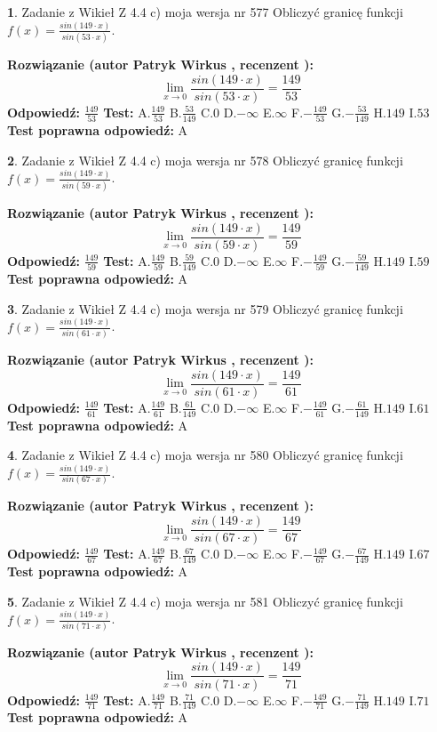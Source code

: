 \documentclass[12pt, a4paper]{article}
\theoremstyle{definition} %
\newtheorem{zad}{}
\newcommand{\zadStart}[1]{\begin{zad}#1\newline}
\newcommand{\zadStop}{\end{zad}}
\newcommand{\rozwStart}[2]{\noindent \textbf{Rozwiązanie (autor #1 , recenzent #2): }\newline}
\newcommand{\rozwStop}{\newline}
\newcommand{\odpStart}{\noindent \textbf{Odpowiedź:}\newline}
\newcommand{\odpStop}{\newline}
\newcommand{\testStart}{\noindent \textbf{Test:}\newline}
\newcommand{\testStop}{\newline}
\newcommand{\kluczStart}{\noindent \textbf{Test poprawna odpowiedź:}\newline}
\newcommand{\kluczStop}{\newline}
\begin{document}
\zadStart{Zadanie z Wikieł Z 4.4 c) moja wersja nr 577}
Obliczyć granicę funkcji $f(x)=\frac{sin(149\cdot x)}{sin(53\cdot x)}$.
\zadStop
\rozwStart{Patryk Wirkus}{}
$$\lim\limits_{x\to 0}\frac{sin(149\cdot x)}{sin(53\cdot x)}=
\frac{149}{53}$$
\rozwStop
\odpStart
$\frac{149}{53}$
\odpStop
\testStart
A.$\frac{149}{53}$
B.$\frac{53}{149}$
C.$0$
D.$-\infty$
E.$\infty$
F.$-\frac{149}{53}$
G.$-\frac{53}{149}$
H.$149$
I.$53$
\testStop
\kluczStart
A
\kluczStop



\zadStart{Zadanie z Wikieł Z 4.4 c) moja wersja nr 578}
Obliczyć granicę funkcji $f(x)=\frac{sin(149\cdot x)}{sin(59\cdot x)}$.
\zadStop
\rozwStart{Patryk Wirkus}{}
$$\lim\limits_{x\to 0}\frac{sin(149\cdot x)}{sin(59\cdot x)}=
\frac{149}{59}$$
\rozwStop
\odpStart
$\frac{149}{59}$
\odpStop
\testStart
A.$\frac{149}{59}$
B.$\frac{59}{149}$
C.$0$
D.$-\infty$
E.$\infty$
F.$-\frac{149}{59}$
G.$-\frac{59}{149}$
H.$149$
I.$59$
\testStop
\kluczStart
A
\kluczStop



\zadStart{Zadanie z Wikieł Z 4.4 c) moja wersja nr 579}
Obliczyć granicę funkcji $f(x)=\frac{sin(149\cdot x)}{sin(61\cdot x)}$.
\zadStop
\rozwStart{Patryk Wirkus}{}
$$\lim\limits_{x\to 0}\frac{sin(149\cdot x)}{sin(61\cdot x)}=
\frac{149}{61}$$
\rozwStop
\odpStart
$\frac{149}{61}$
\odpStop
\testStart
A.$\frac{149}{61}$
B.$\frac{61}{149}$
C.$0$
D.$-\infty$
E.$\infty$
F.$-\frac{149}{61}$
G.$-\frac{61}{149}$
H.$149$
I.$61$
\testStop
\kluczStart
A
\kluczStop



\zadStart{Zadanie z Wikieł Z 4.4 c) moja wersja nr 580}
Obliczyć granicę funkcji $f(x)=\frac{sin(149\cdot x)}{sin(67\cdot x)}$.
\zadStop
\rozwStart{Patryk Wirkus}{}
$$\lim\limits_{x\to 0}\frac{sin(149\cdot x)}{sin(67\cdot x)}=
\frac{149}{67}$$
\rozwStop
\odpStart
$\frac{149}{67}$
\odpStop
\testStart
A.$\frac{149}{67}$
B.$\frac{67}{149}$
C.$0$
D.$-\infty$
E.$\infty$
F.$-\frac{149}{67}$
G.$-\frac{67}{149}$
H.$149$
I.$67$
\testStop
\kluczStart
A
\kluczStop



\zadStart{Zadanie z Wikieł Z 4.4 c) moja wersja nr 581}
Obliczyć granicę funkcji $f(x)=\frac{sin(149\cdot x)}{sin(71\cdot x)}$.
\zadStop
\rozwStart{Patryk Wirkus}{}
$$\lim\limits_{x\to 0}\frac{sin(149\cdot x)}{sin(71\cdot x)}=
\frac{149}{71}$$
\rozwStop
\odpStart
$\frac{149}{71}$
\odpStop
\testStart
A.$\frac{149}{71}$
B.$\frac{71}{149}$
C.$0$
D.$-\infty$
E.$\infty$
F.$-\frac{149}{71}$
G.$-\frac{71}{149}$
H.$149$
I.$71$
\testStop
\kluczStart
A
\kluczStop
\end{document}
